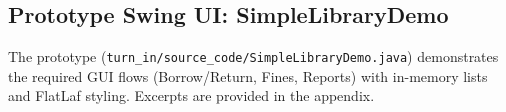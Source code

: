 \documentclass[12pt,a4paper]{article}
\newcommand{\file}[1]{\texttt{#1}}
\begin{document}
\begin{comment}
\begin{lstlisting}[style=sql, caption=Oracle schema and synchronized data]
-- Create core tables
CREATE TABLE Students (
  student_id NUMBER PRIMARY KEY,
  name VARCHAR2(100) NOT NULL,
  email VARCHAR2(100) UNIQUE NOT NULL,
  phone VARCHAR2(20), address VARCHAR2(200),
  registration_date DATE DEFAULT SYSDATE
);

CREATE TABLE Books (
  book_id NUMBER PRIMARY KEY,
  title VARCHAR2(200) NOT NULL,
  author VARCHAR2(100) NOT NULL,
  isbn VARCHAR2(20) UNIQUE,
  category VARCHAR2(50), publication_year NUMBER(4),
  available_copies NUMBER DEFAULT 0, total_copies NUMBER DEFAULT 0
);

CREATE TABLE Loans (
  loan_id NUMBER PRIMARY KEY,
  student_id NUMBER NOT NULL,
  book_id NUMBER NOT NULL,
  loan_date DATE DEFAULT SYSDATE,
  due_date DATE NOT NULL,
  return_date DATE, status VARCHAR2(20) DEFAULT 'ACTIVE',
  renewal_count NUMBER DEFAULT 0,
  CONSTRAINT fk_loan_student FOREIGN KEY (student_id) REFERENCES Students(student_id),
  CONSTRAINT fk_loan_book FOREIGN KEY (book_id) REFERENCES Books(book_id)
);

CREATE TABLE Fines (
  fine_id NUMBER PRIMARY KEY,
  student_id NUMBER NOT NULL,
  loan_id NUMBER NOT NULL,
  fine_amount NUMBER(10,2) NOT NULL,
  fine_date DATE DEFAULT SYSDATE,
  payment_date DATE,
  payment_status VARCHAR2(20) DEFAULT 'UNPAID'
);

-- Sample rows aligned to Mongo seed
INSERT INTO Students (student_id, name, email) VALUES (1001, 'John Smith', 'john.smith@email.com');
INSERT INTO Books (book_id, title, author, isbn, category, publication_year, available_copies, total_copies)
VALUES (2001, 'Database Systems', 'Silberschatz, Korth, Sudarshan', '9780078022159', 'Databases', 2020, 2, 5);
INSERT INTO Loans (loan_id, student_id, book_id, loan_date, due_date, status, renewal_count)
VALUES (3001, 1001, 2001, DATE '2025-08-01', DATE '2025-08-15', 'ACTIVE', 0);
INSERT INTO Fines (fine_id, student_id, loan_id, fine_amount, payment_status)
VALUES (4001, 1001, 3001, 12.50, 'UNPAID');
\end{lstlisting}
\end{comment}

\subsection{Prototype Swing UI: SimpleLibraryDemo}

The prototype (\file{turn\_in/source\_code/SimpleLibraryDemo.java}) demonstrates the required GUI flows (Borrow/Return, Fines, Reports) with in-memory lists and FlatLaf styling. Excerpts are provided in the appendix.
\end{document}
